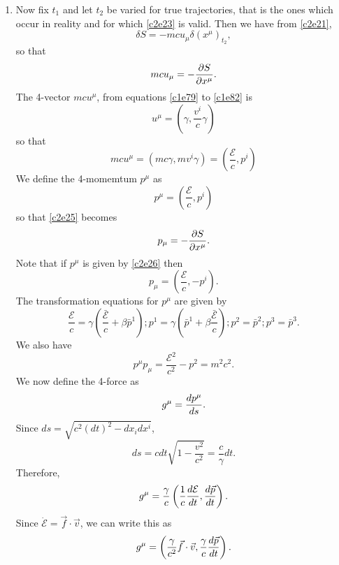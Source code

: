 \begin{enumerate}
\item Now fix $t_1$ and let $t_2$ be varied for true trajectories, that is the
ones which occur in reality and for which \eqref{c2e23} is valid. Then we have 
from
\eqref{c2e21},
\begin{equation}\label{c2e24}
\delta S = -mcu_\mu \delta (x^\mu)_{t_2},
\end{equation}
so that
\begin{equation}\label{c2e25}
mcu_\mu = -\frac{\partial{S}}{\partial{x^\mu}}.
\end{equation}
The 4-vector $mcu^\mu$, from equations \eqref{c1e79} to \eqref{c1e82} is
\[
u^\mu = \left(\gamma, \frac{v^i}{c}\gamma\right)
\]
so that
\[
mcu^\mu = \left(mc\gamma, mv^i\gamma\right) = 
\left(\frac{\mathcal{E}}{c}, p^i\right)
\]
We define the 4-momemtum $p^\mu$ as
\begin{equation}\label{c2e26}
p^\mu = \left(\frac{\mathcal{E}}{c}, p^i\right)
\end{equation}
so that \eqref{c2e25} becomes
\begin{equation}\label{c2e27}
p_\mu = -\frac{\partial{S}}{\partial{x^\mu}}.
\end{equation}
Note that if $p^\mu$ is given by \eqref{c2e26} then
\begin{equation}\label{c2e28}
p_\mu = \left(\frac{\mathcal{E}}{c}, -p^i\right).
\end{equation}
The transformation equations for $p^\mu$ are given by
\begin{equation}\label{c2e29}
\frac{\mathcal{E}}{c} = 
\gamma\left(\frac{\bar{\mathcal{E}}}{c} + \beta\bar{p}^1\right);
p^1 = \gamma\left(\bar{p}^1 + \beta\frac{\bar{\mathcal{E}}}{c}\right); p^2 = 
\bar{p}^2; p^3 = \bar{p}^3.
\end{equation}
We also have
\begin{equation}\label{c2e30}
p^\mu p_\mu = \frac{\mathcal{E}^2}{c^2} - p^2 = m^2c^2.
\end{equation}
We now define the 4-force as 
\begin{equation}\label{c2e31}
g^\mu = \frac{d{p^\mu}}{d{s}}.
\end{equation}
Since $ds = \sqrt{c^2(dt)^2 - dx_i dx^i}$,
\begin{equation}\label{c2e32}
ds = cdt\sqrt{1 - \frac{v^2}{c^2}} = \frac{c}{\gamma}dt.
\end{equation}
Therefore,
\[
g^\mu = \frac{\gamma}{c}
\left(\frac{1}{c}\frac{d{\mathcal{E}}}{d{t}}, \frac{d{\vec{p}}}{d{t}}\right).
\]
Since $\dot{\mathcal{E}} = \vec{f}\cdot\vec{v}$, we can write this as
\begin{equation}\label{c2e33}
g^\mu = \left(\frac{\gamma}{c^2}\vec{f}\cdot\vec{v}, 
\frac{\gamma}{c}\frac{d{\vec{p}}}{d{t}}\right).
\end{equation}


\end{enumerate}
